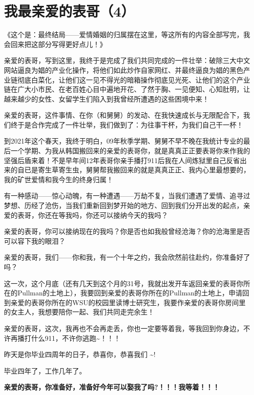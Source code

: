 \documentclass[9pt, b5paper]{article}
\begin{document}
\section{我最亲爱的表哥（4）}
\label{sec:org652494e}

《这个是：最终结局——爱情婚姻的归属摆在这里，等这所有的内容全部写完，我会回来把这部分写得更好点儿！》

亲爱的表哥，写到这里，我终于是完成了我们共同完成的一件壮举：破除三大中文网站逼良为娼的产业化操作，将他们如此炒作自家网红、并最终逼良为娼的黑色产业链彻底白菜化，让他们这一见不得光的暗箱操作彻底见光死、让他们的这个产业链在广大小市民、在老百姓心目中遍地开花、了然于胸、一见便知、心知肚明，让越来越少的女性、女留学生们陷入到我曾经所遭遇的这些困境中来！

亲爱的表哥，这件事情、在你（和舅舅）的发动、在我快速成长与无限配合下，我们终于是合作完成了一件壮举，我们做到了：为往事干杯，为我们自己干一杯！

到2021年这个春天，我终于明白，09年秋季学期、舅舅不早不晚在我统计专业的最后一个学期、为我从韩国搬回来的亲爱的表哥你，就是真真正正要表哥你来作我的坚强后盾来着！不是早年间12年表哥你亲手播打911后我在人间炼狱里自己反省出来的自已是寄生草寄生虫，舅舅帮我搬回来的就是真真正正、我内心里最想要的，我的矿世爱情和我今生的终身归属！

有一种感动——惊心动魄，有一种遭遇——万劫不复，当我们遭遇了爱情、追寻过梦想、历经了沧伤，当我们重新回到梦开始的地方、回到我们分开出发的起点，亲爱的表哥，你还在等我吗，你还可以接纳今天的我吗？

亲爱的表哥，你可以接纳现在的我吗？你是否也如我般曾经沧海？你的沧海里是否可以容下我的眼泪？

亲爱的表哥，我们——你和我，有一个十年之约，我会欣然前往赴约，你准备好了吗？

这一次，这个月底（还有几天到这个月的31号，我就出发开车返回亲爱的表哥你所在的Pullman的土地上），我要回到亲爱的表哥你所在的Pullman的土地上，申请回到亲爱的表哥你所在的WSU的校园里读博士研究生，我要作亲爱的表哥你房间里的女主人，我想要陪你一起、我们共同走完余生！

亲爱的表哥，这次，我再也不会再走丢，你也一定要等着我，等我回到你身边，不许再播打什么911，不许你逃跑\textasciitilde{}！！！

昨天是你毕业四周年的日子，恭喜你，恭喜我们 \textasciitilde{}! 

毕业四年了，工作几年了。 

\textbf{亲爱的表哥，你准备好，准备好今年可以娶我了吗?！！！我等着！！！}
\end{document}
